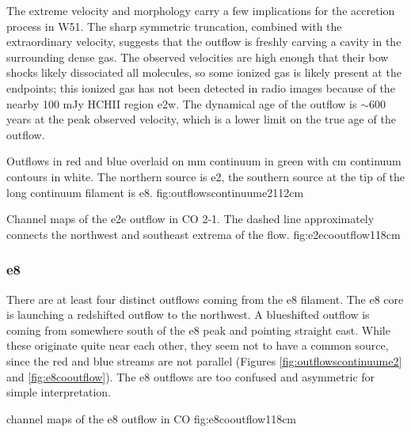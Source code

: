 \documentclass{aa}
\begin{document}
The extreme velocity and morphology carry a few implications for the
accretion process in W51.  The sharp symmetric truncation, combined with the
extraordinary velocity, suggests that the outflow is freshly carving a cavity
in the surrounding dense gas.  The observed velocities are high enough that
their bow shocks likely dissociated all molecules, so some ionized gas is
likely present at the endpoints; this ionized gas has not been detected in
radio images because of the nearby 100 mJy HCHII region e2w.  The dynamical age
of the outflow is $\sim600$ years at the peak observed velocity, which is a
lower limit on the true age of the outflow.


{Outflows in red and blue overlaid on mm continuum in green with cm continuum
contours in white.  The northern source is e2, the southern source at the tip
of the long continuum filament is e8.}
{fig:outflowscontinuume2}{1}{12cm}


{Channel maps of the e2e outflow in CO 2-1.  The dashed line approximately
connects the northwest and southeast extrema of the flow.}
{fig:e2ecooutflow}{1}{18cm}

\subsubsection{e8}
There are at least four distinct outflows coming from the e8 filament.
The e8 core is launching a redshifted outflow to the northwest.  A blueshifted
outflow is coming from somewhere south of the e8 peak and pointing straight
east.  While these originate quite near each other, they seem not to have
a common source, since the red and blue streams are not parallel (Figures
\ref{fig:outflowscontinuume2} and \ref{fig:e8cooutflow}).  The e8 outflows are too
confused and asymmetric for simple interpretation.


{channel maps of the e8 outflow in CO}
{fig:e8cooutflow}{1}{18cm}



\end{document}
